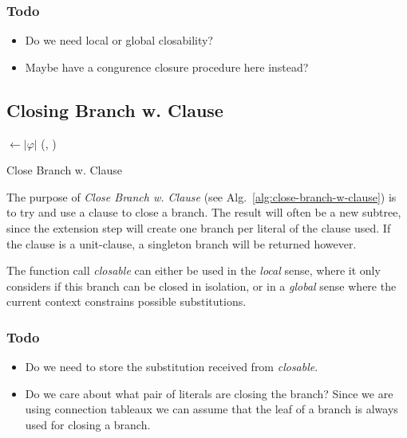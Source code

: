 \documentclass{article}
\begin{document}
\subsubsection{Todo}
\begin{itemize}
\item Do we need local or global closability?
\item Maybe have a congurence closure procedure here instead?
\end{itemize}


\subsection{Closing Branch w. Clause}

\begin{algorithm}[H]

  \SetAlgoLined

  \maxstep$\leftarrow |\varphi|$\;  
  \Return (\none, \maxstep)\;

  \caption{Close Branch w. Clause}
  \label{alg:close-branch-w-clause}
\end{algorithm}

The purpose of \emph{Close Branch w. Clause} (see
Alg.~\ref{alg:close-branch-w-clause}) is to try and use a clause to
close a branch. The result will often be a new subtree, since the
extension step will create one branch per literal of the clause
used. If the clause is a unit-clause, a singleton branch will be
returned however.

The function call \emph{closable} can either be used in the
\emph{local} sense, where it only considers if this branch can be
closed in isolation, or in a \emph{global} sense where the current
context constrains possible substitutions.

\subsubsection{Todo}
\begin{itemize}
\item Do we need to store the substitution received from \emph{closable}.
\item Do we care about what pair of literals are closing the branch?
  Since we are using connection tableaux we can assume that the leaf
  of a branch is always used for closing a branch.
\end{itemize}
\end{document}
